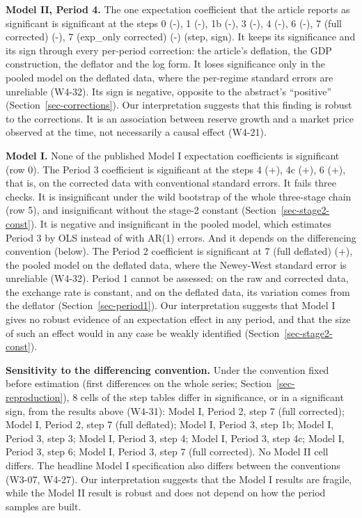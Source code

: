 \documentclass[
  12pt,
  a4paper,
]{article}
\begin{document}
\textbf{Model II, Period 4.} The one expectation coefficient that the
article reports as significant is significant at the steps 0 (-), 1 (-),
1b (-), 3 (-), 4 (-), 6 (-), 7 (full corrected) (-), 7 (exp\_only
corrected) (-) (step, sign). It keeps its significance and its sign
through every per-period correction: the article's deflation, the GDP
construction, the deflator and the log form. It loses significance only
in the pooled model on the deflated data, where the per-regime standard
errors are unreliable (W4-32). Its sign is negative, opposite to the
abstract's ``positive'' (Section~\ref{sec-corrections}). Our
interpretation suggests that this finding is robust to the corrections.
It is an association between reserve growth and a market price observed
at the time, not necessarily a causal effect (W4-21).

\textbf{Model I.} None of the published Model I expectation coefficients
is significant (row 0). The Period 3 coefficient is significant at the
steps 4 (+), 4c (+), 6 (+), that is, on the corrected data with
conventional standard errors. It fails three checks. It is insignificant
under the wild bootstrap of the whole three-stage chain (row 5), and
insignificant without the stage-2 constant
(Section~\ref{sec-stage2-const}). It is negative and insignificant in
the pooled model, which estimates Period 3 by OLS instead of with AR(1)
errors. And it depends on the differencing convention (below). The
Period 2 coefficient is significant at 7 (full deflated) (+), the pooled
model on the deflated data, where the Newey-West standard error is
unreliable (W4-32). Period 1 cannot be assessed: on the raw and
corrected data, the exchange rate is constant, and on the deflated data,
its variation comes from the deflator (Section~\ref{sec-period1}). Our
interpretation suggests that Model I gives no robust evidence of an
expectation effect in any period, and that the size of such an effect
would in any case be weakly identified (Section~\ref{sec-stage2-const}).

\textbf{Sensitivity to the differencing convention.} Under the
convention fixed before estimation (first differences on the whole
series; Section~\ref{sec-reproduction}), 8 cells of the step tables
differ in significance, or in a significant sign, from the results above
(W4-31): Model I, Period 2, step 7 (full corrected); Model I, Period 2,
step 7 (full deflated); Model I, Period 3, step 1b; Model I, Period 3,
step 3; Model I, Period 3, step 4; Model I, Period 3, step 4c; Model I,
Period 3, step 6; Model I, Period 3, step 7 (full corrected). No Model
II cell differs. The headline Model I specification also differs between
the conventions (W3-07, W4-27). Our interpretation suggests that the
Model I results are fragile, while the Model II result is robust and
does not depend on how the period samples are built.
\end{document}
